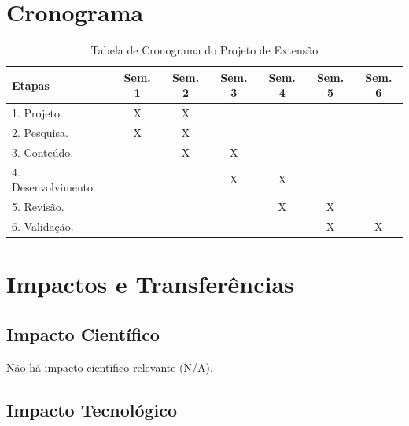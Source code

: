 \documentclass[a4paper,12pt]{article} %
\begin{document}
\section{Cronograma}

\begin{table}[H]
\begin{center}
 \caption{Tabela de Cronograma do Projeto de Extensão}
\begin{tabular}{|l|c|c|c|c|c|c|}
  \hline \hline
   \textbf{Etapas} & \textbf{Sem. 1} & \textbf{Sem. 2} & \textbf{Sem. 3} & \textbf{Sem. 4} & \textbf{Sem. 5} & \textbf{Sem. 6} \\ \hline \hline
   1. Projeto. & X & X &  &  &  &  \\ \hline
   2. Pesquisa. & X & X &  &  &  &  \\ \hline
   3. Conteúdo. &  & X & X &  &  &  \\ \hline
   4. Desenvolvimento. &  &  & X & X &  &  \\ \hline
   5. Revisão. &  &  &  & X & X &  \\ \hline
   6. Validação. &  &  &  &  & X & X \\ \hline \hline
\end{tabular}
\end{center}
\end{table}

\section{Impactos e Transferências}


\subsection{Impacto Científico}

Não há impacto científico relevante (N/A).


\subsection{Impacto Tecnológico}
\end{document}
